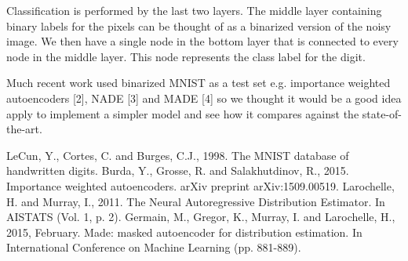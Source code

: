 \documentclass[twoside]{homework}
\begin{document}
Classification is performed by the last two layers. The middle layer containing binary labels for the pixels can be thought of as a binarized version of the noisy image. We then have a single node in the bottom layer that is connected to every node in the middle layer. This node represents the class label for the digit.

Much recent work used binarized MNIST as a test set e.g. importance weighted autoencoders [2], NADE [3] and MADE [4] so we thought it would be a good idea apply to implement a simpler model and see how it compares against the state-of-the-art. \newline

\noindent
[1] LeCun, Y., Cortes, C. and Burges, C.J., 1998. The MNIST database of handwritten digits. \newline
[2] Burda, Y., Grosse, R. and Salakhutdinov, R., 2015. Importance weighted autoencoders. arXiv preprint arXiv:1509.00519. \newline
[3] Larochelle, H. and Murray, I., 2011. The Neural Autoregressive Distribution Estimator. In AISTATS (Vol. 1, p. 2). \newline
[4] Germain, M., Gregor, K., Murray, I. and Larochelle, H., 2015, February. Made: masked autoencoder for distribution estimation. In International Conference on Machine Learning (pp. 881-889).
\end{document}
